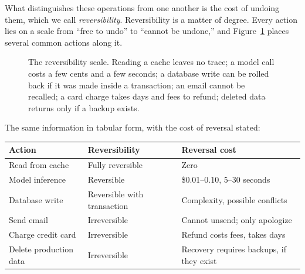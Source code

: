 \documentclass[11pt]{book}
\begin{document}
What distinguishes these operations from one another is the cost of undoing them, which we call \emph{reversibility}. Reversibility is a matter of degree. Every action lies on a scale from ``free to undo'' to ``cannot be undone,'' and Figure~\ref{fig:reversibility} places several common actions along it.

\begin{figure}[htbp]
\centering
{}
\caption{The reversibility scale. Reading a cache leaves no trace; a model call costs a few cents and a few seconds; a database write can be rolled back if it was made inside a transaction; an email cannot be recalled; a card charge takes days and fees to refund; deleted data returns only if a backup exists.}
\label{fig:reversibility}
\end{figure}

The same information in tabular form, with the cost of reversal stated:

\begin{center}
\begin{tabular}{lll}
\toprule
Action & Reversibility & Reversal cost \\
\midrule
Read from cache & Fully reversible & Zero \\
Model inference & Reversible & \$0.01--0.10, 5--30 seconds \\
Database write & Reversible with transaction & Complexity, possible conflicts \\
Send email & Irreversible & Cannot unsend; only apologize \\
Charge credit card & Irreversible & Refund costs fees, takes days \\
Delete production data & Irreversible & Recovery requires backups, if they exist \\
\bottomrule
\end{tabular}
\end{center}
\end{document}
